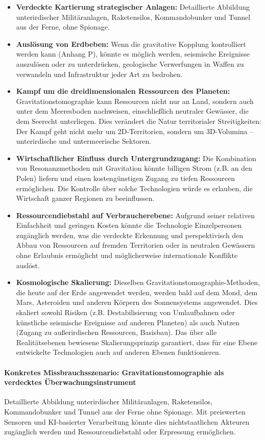 \documentclass[12pt,a4paper]{article}
\theoremstyle{remark}
\begin{document}
	\begin{itemize}[leftmargin=*]
		\item \textbf{Verdeckte Kartierung strategischer Anlagen:} Detaillierte Abbildung unterirdischer Militäranlagen, Raketensilos, Kommandobunker und Tunnel aus der Ferne, ohne Spionage.
		\item \textbf{Auslösung von Erdbeben:} Wenn die gravitative Kopplung kontrolliert werden kann (Anhang P), könnte es möglich werden, seismische Ereignisse auszulösen oder zu unterdrücken, geologische Verwerfungen in Waffen zu verwandeln und Infrastruktur jeder Art zu bedrohen.
		\item \textbf{Kampf um die dreidimensionalen Ressourcen des Planeten:} Gravitationstomographie kann Ressourcen nicht nur an Land, sondern auch unter dem Meeresboden nachweisen, einschließlich neutraler Gewässer, die dem Seerecht unterliegen. Dies verändert die Natur territorialer Streitigkeiten: Der Kampf geht nicht mehr um 2D-Territorien, sondern um 3D-Volumina – unterirdische und untermeerische Sektoren.
		\item \textbf{Wirtschaftlicher Einfluss durch Untergrundzugang:} Die Kombination von Resonanzmethoden mit Gravitation könnte billigen Strom (z.B. an den Polen) liefern und einen kostengünstigen Zugang zu tiefen Ressourcen ermöglichen. Die Kontrolle über solche Technologien würde es erlauben, die Wirtschaft ganzer Regionen zu beeinflussen.
		\item \textbf{Ressourcendiebstahl auf Verbraucherebene:} Aufgrund seiner relativen Einfachheit und geringen Kosten könnte die Technologie Einzelpersonen zugänglich werden, was die verdeckte Erkennung und perspektivisch den Abbau von Ressourcen auf fremden Territorien oder in neutralen Gewässern ohne Erlaubnis ermöglicht und möglicherweise internationale Konflikte auslöst.
		\item \textbf{Kosmologische Skalierung:} Dieselben Gravitationstomographie-Methoden, die heute auf der Erde angewendet werden, werden bald auf dem Mond, dem Mars, Asteroiden und anderen Körpern des Sonnensystems angewendet. Dies skaliert sowohl Risiken (z.B. Destabilisierung von Umlaufbahnen oder künstliche seismische Ereignisse auf anderen Planeten) als auch Nutzen (Zugang zu außerirdischen Ressourcen, Basisbau). Das über alle Realitätsebenen bewiesene Skalierungsprinzip garantiert, dass für eine Ebene entwickelte Technologien auch auf anderen Ebenen funktionieren.
	\end{itemize}
	
	\paragraph{Konkretes Missbrauchsszenario: Gravitationstomographie als verdecktes Überwachungsinstrument}
	Detaillierte Abbildung unterirdischer Militäranlagen, Raketensilos, Kommandobunker und Tunnel aus der Ferne ohne Spionage. Mit preiswerten Sensoren und KI-basierter Verarbeitung könnte dies nichtstaatlichen Akteuren zugänglich werden und Ressourcendiebstahl oder Erpressung ermöglichen.
	
\end{document}
